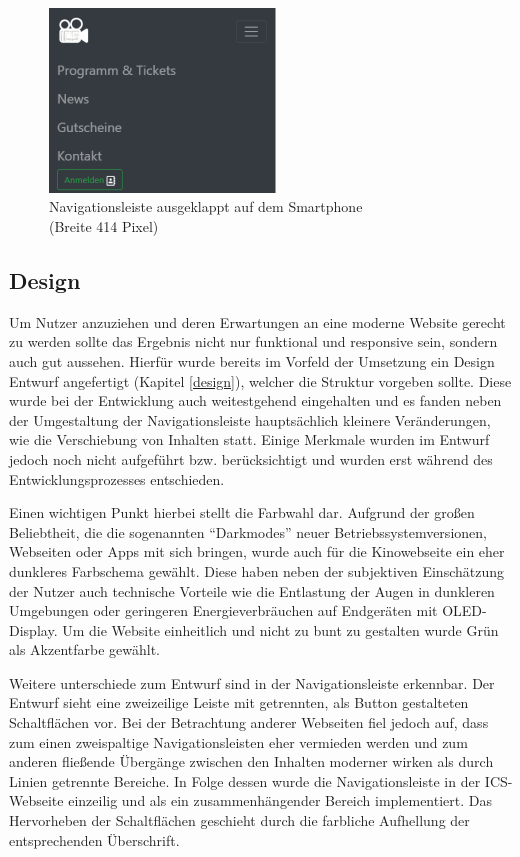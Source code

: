 	\begin{figure}[H]
		\centering 
		\includegraphics[width=6cm]{img/navLeisteAus.png}
		\captionsetup{format=hang}
		\caption[Navigationsleiste ausgeklappt]{\label{fig:navLeisteAus} Navigationsleiste ausgeklappt auf dem Smartphone\\ (Breite 414 Pixel)}
	\end{figure}

	\subsection{Design} \label{subdesign}
	Um Nutzer anzuziehen und deren Erwartungen an eine moderne Website gerecht zu werden sollte das Ergebnis nicht nur funktional und responsive sein, sondern auch gut aussehen. Hierfür wurde bereits im Vorfeld der Umsetzung ein Design Entwurf angefertigt (Kapitel \vref{design}), welcher die Struktur vorgeben sollte. Diese wurde bei der Entwicklung auch weitestgehend eingehalten und es fanden neben der Umgestaltung der Navigationsleiste hauptsächlich kleinere Veränderungen, wie die Verschiebung von Inhalten statt. Einige Merkmale wurden im Entwurf jedoch noch nicht aufgeführt bzw. berücksichtigt und wurden erst während des Entwicklungsprozesses entschieden. 
	
	
	Einen wichtigen Punkt hierbei stellt die Farbwahl dar. Aufgrund der großen Beliebtheit, die die sogenannten \enquote{Darkmodes} neuer Betriebssystemversionen, Webseiten oder Apps mit sich bringen, wurde auch für die Kinowebseite ein eher dunkleres Farbschema gewählt. Diese haben neben der subjektiven Einschätzung der Nutzer auch technische Vorteile wie die Entlastung der Augen in dunkleren Umgebungen oder geringeren Energieverbräuchen auf Endgeräten mit OLED-Display\autocite[Vgl.][]{OLED}. Um die Website einheitlich und nicht zu bunt zu gestalten wurde Grün als Akzentfarbe gewählt.
	
	
	Weitere unterschiede zum Entwurf sind in der Navigationsleiste erkennbar. Der Entwurf sieht eine zweizeilige Leiste mit getrennten, als Button gestalteten Schaltflächen vor. Bei der Betrachtung anderer Webseiten fiel jedoch auf, dass zum einen zweispaltige Navigationsleisten eher vermieden werden und zum anderen fließende Übergänge zwischen den Inhalten moderner wirken als durch Linien getrennte Bereiche. In Folge dessen wurde die Navigationsleiste in der \ac{ICS}-Webseite einzeilig und als ein zusammenhängender Bereich implementiert. Das Hervorheben der Schaltflächen geschieht durch die farbliche Aufhellung der entsprechenden Überschrift. 
	
